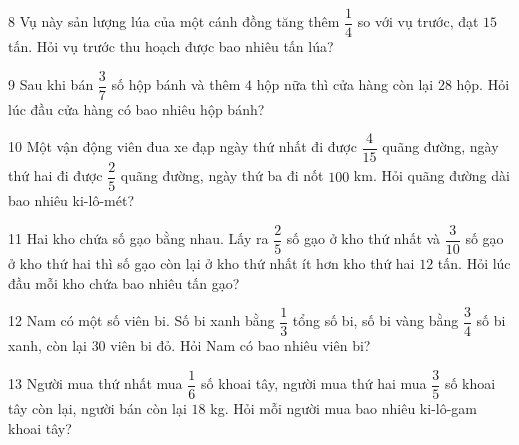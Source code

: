 \gap
\begin{probbox}{8}{\relax}
Vụ này sản lượng lúa của một cánh đồng tăng thêm $\dfrac14$ so với vụ trước, đạt $15$ tấn. Hỏi vụ trước thu hoạch được bao nhiêu tấn lúa?
\end{probbox}
\gap
\begin{probbox}{9}{\relax}
Sau khi bán $\dfrac37$ số hộp bánh và thêm $4$ hộp nữa thì cửa hàng còn lại $28$ hộp. Hỏi lúc đầu cửa hàng có bao nhiêu hộp bánh?
\end{probbox}
\gap
\begin{probbox}{10}{\relax}
Một vận động viên đua xe đạp ngày thứ nhất đi được $\dfrac4{15}$ quãng đường, ngày thứ hai đi được $\dfrac25$ quãng đường, ngày thứ ba đi nốt $100$ km. Hỏi quãng đường dài bao nhiêu ki-lô-mét?
\end{probbox}
\gap
\begin{probbox}{11}{\relax}
Hai kho chứa số gạo bằng nhau. Lấy ra $\dfrac25$ số gạo ở kho thứ nhất và $\dfrac3{10}$ số gạo ở kho thứ hai thì số gạo còn lại ở kho thứ nhất ít hơn kho thứ hai $12$ tấn. Hỏi lúc đầu mỗi kho chứa bao nhiêu tấn gạo?
\end{probbox}
\gap
\begin{probbox}{12}{\relax}
Nam có một số viên bi. Số bi xanh bằng $\dfrac13$ tổng số bi, số bi vàng bằng $\dfrac34$ số bi xanh, còn lại $30$ viên bi đỏ. Hỏi Nam có bao nhiêu viên bi?
\end{probbox}
\gap
\begin{probbox}{13}{\relax}
Người mua thứ nhất mua $\dfrac16$ số khoai tây, người mua thứ hai mua $\dfrac35$ số khoai tây còn lại, người bán còn lại $18$ kg. Hỏi mỗi người mua bao nhiêu ki-lô-gam khoai tây?
\end{probbox}
